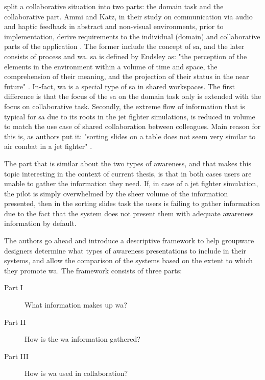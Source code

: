 \cite{gutwin_descriptive_2002} split a collaborative situation into two parts: the domain task and the collaborative part. Ammi and Katz, in their study on communication via audio and haptic feedback in abstract and non-visual environments, prior to implementation, derive requirements to the individual (domain) and collaborative parts of the application \cite{ammi_intermodal_2015}. The former include the concept of \gls{sa}, and the later consists of process and \gls{wa}.
\gls{sa} is defined by Endsley as: "the perception of the elements in the environment within a volume of time and space, the comprehension of their meaning, and the projection of their status in the near future" \cite{endsley_situation_1988}. In-fact, \gls{wa} is a special type of \gls{sa} in shared workspaces. The first difference is that the focus of the \gls{sa} on the domain task only is extended with the focus on collaborative task. Secondly, the extreme flow of information that is typical for \gls{sa} due to its roots in the jet fighter simulations, is reduced in volume to match the use case of shared collaboration between colleagues. Main reason for this is, as authors put it: "sorting slides on a table does not seem very similar to air combat in a jet fighter" \cite{gutwin_descriptive_2002}.

The part that is similar about the two types of awareness, and that makes this topic interesting in the context of current thesis, is that in both cases users are unable to gather the information they need. If, in case of a jet fighter simulation, the pilot is simply overwhelmed by the sheer volume of the information presented, then in the sorting slides task the users is failing to gather information due to the fact that the system does not present them with adequate awareness information by default.

The authors go ahead and introduce a descriptive framework to help groupware
designers determine what types of awareness presentations to include in their systems, and allow the comparison of the systems based on the extent to which they promote \gls{wa}.
The framework consists of three parts:
\begin{description}
	\item[Part I] What information makes up \gls{wa}?
	\item[Part II] How is the \gls{wa} information gathered?
	\item[Part III] How is \gls{wa} used in collaboration?
\end{description}

